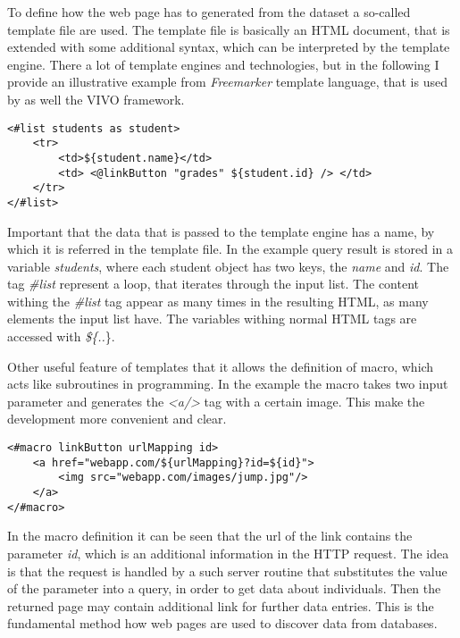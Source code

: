 To define how the web page has to generated from the dataset a so-called template file are used. The template file is basically an HTML document, that is extended with some additional syntax, which can be interpreted by the template engine. There a lot of template engines and technologies, but in the following I provide an illustrative example from \textit{Freemarker} template language, that is used by as well the VIVO framework.

\begin{lstlisting}[captionpos=b, caption=Template file example, label=skullJSON, belowskip=1em, aboveskip=2em,
basicstyle=\footnotesize,frame=single]
<#list students as student>
	<tr>
		<td>${student.name}</td>
		<td> <@linkButton "grades" ${student.id} /> </td>
	</tr>
</#list>
\end{lstlisting}

Important that the data that is passed to the template engine has a name, by which it is referred in the template file. In the example query result is stored in a variable \textit{students}, where each student object has two keys, the \textit{name} and \textit{id}. The tag \textit{\#list} represent a loop, that iterates through the input list. The content withing the \textit{\#list} tag appear as many times in the resulting HTML, as many elements the input list have. The variables withing normal HTML tags are accessed with \textit{\$\{..}\}. 

Other useful feature of templates that it allows the definition of macro, which acts like subroutines in programming. In the example the macro \textit{\@linkButton} takes two input parameter and generates the \textit{<a/>} tag with a certain image. This make the development more convenient and clear.

\begin{lstlisting}[captionpos=b, caption=Macro definition, label=skullJSON, belowskip=1em, aboveskip=2em,
basicstyle=\footnotesize,frame=single]
<#macro linkButton urlMapping id>
	<a href="webapp.com/${urlMapping}?id=${id}">
		<img src="webapp.com/images/jump.jpg"/>
	</a>
</#macro>
\end{lstlisting}


In the macro definition it can be seen that the url of the link contains the parameter \textit{id}, which is an additional information in the HTTP request. The idea is that the request is handled by a such server routine that substitutes the value of the parameter into a query, in order to get data about individuals. Then the returned page may contain additional link for further data entries. This is the fundamental method how web pages are used to discover data from databases.

